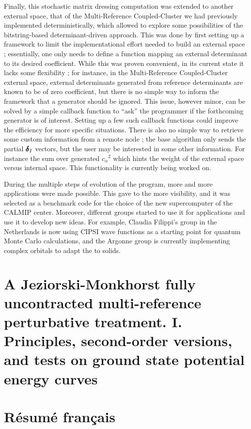 \documentclass[12pt,a4paper]{report}
\begin{document}
Finally, this stochastic matrix dressing computation was extended to another external space, that of the Multi-Reference Coupled-Cluster we had previously implemented deterministically,\cite{Garniron_2017} which allowed to explore some possibilities of the bitstring-based determinant-driven approach.
This was done by first setting up a framework to limit the implementational
effort needed to build an external space ; essentially, one only needs to
define a function mapping an external determinant to its desired coefficient.
While this was proven convenient, in its current state it lacks some
flexibility ; for instance, in the Multi-Reference Coupled-Cluster external
space, external determinants generated from reference determinants are known to
be of zero coefficient, but there is no simple way to inform the framework that
a generator should be ignored. This issue, however minor, can be solved by a
simple callback function to ``ask'' the programmer if the forthcoming generator
is of
interest. Setting up a few such callback functions could improve the efficiency for
more specific situations. There is also no simple way to retrieve some custom
information from a remote node ; the base algorithm only sends the partial
$\pmb \delta_I$ vectors, but the user may be interested in some other
information. For instance the sum over generated ${c_\alpha}^2$ which hints
the weight of the external space versus internal space. This functionality is
currently being worked on.


During the multiple steps of evolution of the program, more and more
applications were made
possible.\cite{Loos_2018,Garniron_2018,Giner_2017,Garniron_2017,Garniron_2017b,Scemama_2018,1806.05115}
This gave to the \QP more visibility, and it was selected as a benchmark code
for the choice of the new supercomputer of the CALMIP center. Moreover,
different groups started to use it for applications and use it to develop new
ideas. For example, Claudia Filippi's group in the Netherlands is now using
CIPSI wave functions as a starting point for quantum Monte Carlo calculations,\cite{Dash_2018}
and the Argonne group is currently implementing complex orbitals to adapt the \QP
to solids.\cite{Benali_2018}

\appendix

\chapter{A Jeziorski-Monkhorst fully uncontracted multi-reference perturbative treatment. I. Principles, second-order versions, and tests on ground state potential energy curves \cite{Giner_2017}}


\chapter{Résumé français}
\minitoc





%
\end{document}
